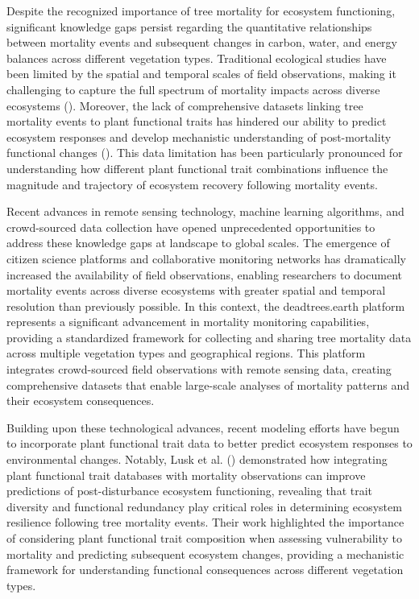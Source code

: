 \documentclass[pdflatex,sn-nature]{sn-jnl}%
\theoremstyle{thmstyleone}%
\theoremstyle{thmstyletwo}%
\theoremstyle{thmstylethree}%
\begin{document}
Despite the recognized importance of tree mortality for ecosystem functioning, significant knowledge gaps persist regarding the quantitative relationships between mortality events and subsequent changes in carbon, water, and energy balances across different vegetation types. Traditional ecological studies have been limited by the spatial and temporal scales of field observations, making it challenging to capture the full spectrum of mortality impacts across diverse ecosystems (\cite{mcdowell2008mechanisms, larson2012tree }). Moreover, the lack of comprehensive datasets linking tree mortality events to plant functional traits has hindered our ability to predict ecosystem responses and develop mechanistic understanding of post-mortality functional changes (\cite{breshears2005regional}). This data limitation has been particularly pronounced for understanding how different plant functional trait combinations influence the magnitude and trajectory of ecosystem recovery following mortality events.

Recent advances in remote sensing technology, machine learning algorithms, and crowd-sourced data collection have opened unprecedented opportunities to address these knowledge gaps at landscape to global scales. The emergence of citizen science platforms and collaborative monitoring networks has dramatically increased the availability of field observations, enabling researchers to document mortality events across diverse ecosystems with greater spatial and temporal resolution than previously possible. In this context, the deadtrees.earth platform represents a significant advancement in mortality monitoring capabilities, providing a standardized framework for collecting and sharing tree mortality data across multiple vegetation types and geographical regions. This platform integrates crowd-sourced field observations with remote sensing data, creating comprehensive datasets that enable large-scale analyses of mortality patterns and their ecosystem consequences.

Building upon these technological advances, recent modeling efforts have begun to incorporate plant functional trait data to better predict ecosystem responses to environmental changes. Notably, Lusk et al. (\cite{lusk2026crowdsourced}) demonstrated how integrating plant functional trait databases with mortality observations can improve predictions of post-disturbance ecosystem functioning, revealing that trait diversity and functional redundancy play critical roles in determining ecosystem resilience following tree mortality events. Their work highlighted the importance of considering plant functional trait composition when assessing vulnerability to mortality and predicting subsequent ecosystem changes, providing a mechanistic framework for understanding functional consequences across different vegetation types.
\end{document}

